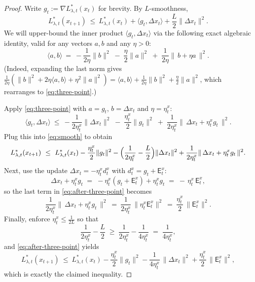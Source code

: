 \documentclass{uai2026} %
\begin{document}
\begin{proof}
Write $g_t:=\nabla L^{*}_{\lambda,t}(x_t)$ for brevity. By $L$-smoothness,
\begin{equation}\label{eq:smooth}
L_{\lambda,t}^{*}(x_{t+1})
~\le~
L_{\lambda,t}^{*}(x_t) + \langle g_t,\Delta x_t\rangle + \frac{L}{2}\|\Delta x_t\|^2.
\end{equation}
We will upper-bound the inner product $\langle g_t,\Delta x_t\rangle$ via the following exact algebraic identity, valid for any vectors $a,b$ and any $\eta>0$:
\begin{equation}\label{eq:three-point}
\langle a,b\rangle
~=~
-\frac{1}{2\eta}\|b\|^2 \;-\; \frac{\eta}{2}\|a\|^2 \;+\; \frac{1}{2\eta}\|\,b+\eta a\,\|^2 .
\end{equation}
(Indeed, expanding the last norm gives
$\tfrac{1}{2\eta}(\|b\|^2+2\eta\langle a,b\rangle+\eta^2\|a\|^2)
= \langle a,b\rangle + \tfrac{1}{2\eta}\|b\|^2 + \tfrac{\eta}{2}\|a\|^2$,
which rearranges to \eqref{eq:three-point}.)

Apply \eqref{eq:three-point} with $a=g_t$, $b=\Delta x_t$ and $\eta=\eta_t^x$:
\[
\langle g_t,\Delta x_t\rangle
~\le~
-\frac{1}{2\eta_t^x}\|\Delta x_t\|^2 \;-\; \frac{\eta_t^x}{2}\|g_t\|^2 
\;+\; \frac{1}{2\eta_t^x}\|\,\Delta x_t+\eta_t^x g_t\,\|^2 .
\]
Plug this into \eqref{eq:smooth} to obtain
\begin{equation}\label{eq:after-three-point}
L_{\lambda,t}^{*}(x_{t+1})
~\le~
L_{\lambda,t}^{*}(x_t)
-\frac{\eta_t^x}{2}\|g_t\|^2
-\Bigl(\frac{1}{2\eta_t^x}-\frac{L}{2}\Bigr)\|\Delta x_t\|^2
+ \frac{1}{2\eta_t^x}\|\,\Delta x_t+\eta_t^x g_t\,\|^2.
\end{equation}
Next, use the update $\Delta x_t=-\eta_t^x d_t^x$ with $d_t^x=g_t+\mathsf{E}_{t}^{x}$:
\[
\Delta x_t+\eta_t^x g_t \;=\; -\eta_t^x(g_t+\mathsf{E}_{t}^{x})+\eta_t^x g_t \;=\; -\,\eta_t^x\,\mathsf{E}_{t}^{x},
\]
so the last term in \eqref{eq:after-three-point} becomes
\[
\frac{1}{2\eta_t^x}\|\,\Delta x_t+\eta_t^x g_t\,\|^2
~=~ \frac{1}{2\eta_t^x}\,\|\eta_t^x \mathsf{E}_{t}^{x}\|^2
~=~ \frac{\eta_t^x}{2}\,\|\mathsf{E}_{t}^{x}\|^2.
\]
Finally, enforce $\eta_t^x\le \tfrac{1}{2L}$ so that
\[
\frac{1}{2\eta_t^x}-\frac{L}{2} \;\ge\; \frac{1}{2\eta_t^x}-\frac{1}{4\eta_t^x} \;=\; \frac{1}{4\eta_t^x},
\]
and \eqref{eq:after-three-point} yields
\[
L_{\lambda,t}^{*}(x_{t+1})
~\le~
L_{\lambda,t}^{*}(x_t)
-\frac{\eta_t^x}{2}\|g_t\|^2
-\frac{1}{4\eta_t^x}\,\|\Delta x_t\|^2
+\frac{\eta_t^x}{2}\,\|\mathsf{E}_{t}^{x}\|^2,
\]
which is exactly the claimed inequality.
\end{proof}
\end{document}
